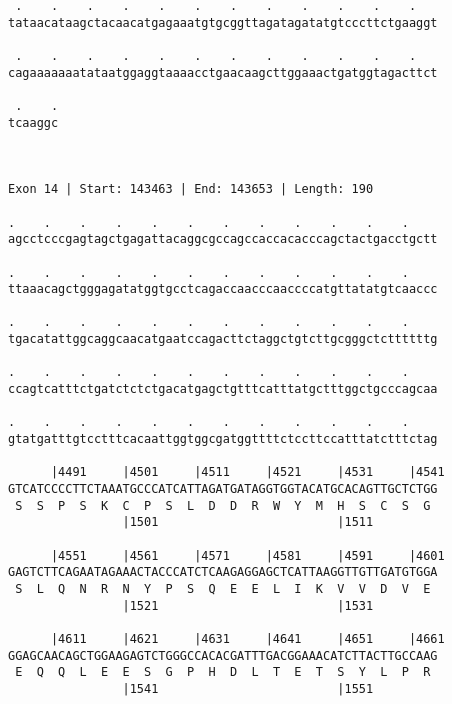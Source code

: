 \documentclass{article}
\begin{document}
\begin{Verbatim}
 .    .    .    .    .    .    .    .    .    .    .    .   
tataacataagctacaacatgagaaatgtgcggttagatagatatgtcccttctgaaggt
                                                            
 .    .    .    .    .    .    .    .    .    .    .    .   
cagaaaaaaatataatggaggtaaaacctgaacaagcttggaaactgatggtagacttct
                                                            
 .    .
tcaaggc
       
       
 
Exon 14 | Start: 143463 | End: 143653 | Length: 190
 
.    .    .    .    .    .    .    .    .    .    .    .    
agcctcccgagtagctgagattacaggcgccagccaccacacccagctactgacctgctt
                                                            
.    .    .    .    .    .    .    .    .    .    .    .    
ttaaacagctgggagatatggtgcctcagaccaacccaaccccatgttatatgtcaaccc
                                                            
.    .    .    .    .    .    .    .    .    .    .    .    
tgacatattggcaggcaacatgaatccagacttctaggctgtcttgcgggctcttttttg
                                                            
.    .    .    .    .    .    .    .    .    .    .    .    
ccagtcatttctgatctctctgacatgagctgtttcatttatgctttggctgcccagcaa
                                                            
.    .    .    .    .    .    .    .    .    .    .    .    
gtatgatttgtcctttcacaattggtggcgatggttttctccttccatttatctttctag
                                                            
      |4491     |4501     |4511     |4521     |4531     |4541
GTCATCCCCTTCTAAATGCCCATCATTAGATGATAGGTGGTACATGCACAGTTGCTCTGG
 S  S  P  S  K  C  P  S  L  D  D  R  W  Y  M  H  S  C  S  G 
                |1501                         |1511         
  
      |4551     |4561     |4571     |4581     |4591     |4601
GAGTCTTCAGAATAGAAACTACCCATCTCAAGAGGAGCTCATTAAGGTTGTTGATGTGGA
 S  L  Q  N  R  N  Y  P  S  Q  E  E  L  I  K  V  V  D  V  E 
                |1521                         |1531         
  
      |4611     |4621     |4631     |4641     |4651     |4661
GGAGCAACAGCTGGAAGAGTCTGGGCCACACGATTTGACGGAAACATCTTACTTGCCAAG
 E  Q  Q  L  E  E  S  G  P  H  D  L  T  E  T  S  Y  L  P  R 
                |1541                         |1551         
  

\end{Verbatim}
\end{document}

